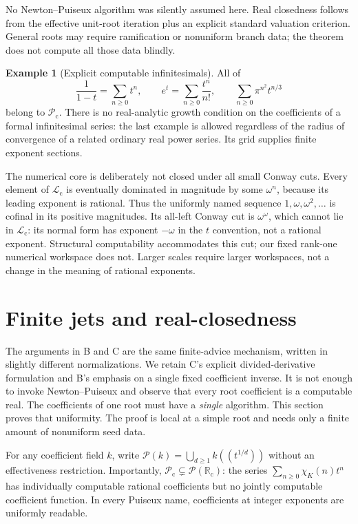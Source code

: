 \documentclass[11pt,letterpaper]{article}
\numberwithin{equation}{section}
\theoremstyle{definition}
\newtheorem{example}[theorem]{Example}
\theoremstyle{remark}
\newcommand{\PP}{\mathcal P}
\newcommand{\Rc}{\mathbb R_{\mathrm c}}
\newcommand{\Lc}{\mathcal L_{\mathrm c}}
\newcommand{\Pc}{\mathcal P_{\mathrm c}}
\begin{document}
No Newton--Puiseux algorithm was silently assumed here. Real closedness
follows from the effective unit-root iteration plus an explicit standard
valuation criterion. General roots may require ramification or nonuniform
branch data; the theorem does not compute all those data blindly.

\begin{example}[Explicit computable infinitesimals]
All of
\[
 \frac{1}{1-t}=\sum_{n\ge0}t^n,\qquad
 e^t=\sum_{n\ge0}\frac{t^n}{n!},\qquad
 \sum_{n\ge0}\pi^{n^2}t^{n/3}
\]
belong to $\Pc$. There is no real-analytic growth condition on the
coefficients of a formal infinitesimal series: the last example is allowed
regardless of the radius of convergence of a related ordinary real power
series. Its grid supplies finite exponent sections.
\end{example}

The numerical core is deliberately not closed under all small Conway
cuts. Every element of $\Lc$ is eventually dominated in magnitude by some
$\omega^n$, because its leading exponent is rational. Thus the uniformly
named sequence $1,\omega,\omega^2,\ldots$ is cofinal in its positive
magnitudes. Its all-left Conway cut is $\omega^\omega$, which cannot lie
in $\Lc$: its normal form has exponent $-\omega$ in the $t$ convention,
not a rational exponent. Structural computability accommodates this cut;
our fixed rank-one numerical workspace does not. Larger scales require
larger workspaces, not a change in the meaning of rational exponents.

\section{Finite jets and real-closedness}
\label{C-sec:realclosed}

The arguments in B and C are the same finite-advice mechanism, written in
slightly different normalizations. We retain C's explicit divided-derivative
formulation and B's emphasis on a single fixed coefficient inverse.
It is not enough to invoke Newton--Puiseux and observe that every root
coefficient is a computable real. The coefficients of one root must have a
\emph{single} algorithm. This section proves that uniformity. The proof is
local at a simple root and needs only a finite amount of nonuniform seed
data.

For any coefficient field $k$, write
$\PP(k)=\bigcup_{d\ge1}k((t^{1/d}))$ without an effectiveness restriction.
Importantly, $\Pc\subsetneq\PP(\Rc)$: the series
$\sum_{n\ge0}\chi_K(n)t^n$ has individually computable rational coefficients
but no jointly computable coefficient function. In every Puiseux name,
coefficients at integer exponents are uniformly readable.
\end{document}
